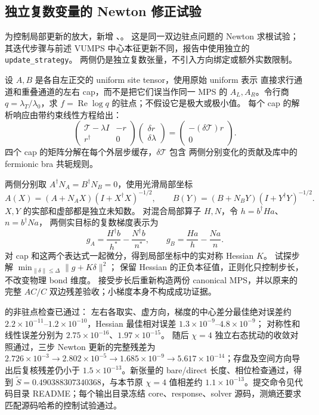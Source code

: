 \subsection{独立复数变量的 Newton 修正试验}
为控制局部更新的放大，新增 、。
这是同一双边驻点问题的 Newton 求根试验；其迭代步骤与前述 VUMPS
中心本征更新不同，报告中使用独立的 \texttt{update\_strategy}。
两侧仍是独立复数张量，不引入方向绑定或额外实数限制。

设 $A,B$ 是各自左正交的 uniform site tensor，使用原始 uniform 表示
直接求行通道和重叠通道的左右 cap，而不是把它们误当作同一 MPS 的
$A_L,A_R$。令行商 $q=\lambda_T/\lambda_0$，求
$f=\operatorname{Re}\log q$ 的驻点；不假设它是极大或极小值。
每个 cap 的解析响应由带约束线性方程给出：
\[
 \begin{pmatrix}\mathcal T-\lambda I&-r\\r^\dagger&0\end{pmatrix}
 \begin{pmatrix}\delta r\\\delta\lambda\end{pmatrix}
 =\begin{pmatrix}-(\delta\mathcal T)r\\0\end{pmatrix}.
\]
四个 cap 的矩阵分解在每个外层步缓存，$\delta\mathcal T$ 包含
两侧分别变化的贡献及库中的 fermionic bra 共轭规则。

两侧分别取 $A^\dagger N_A=B^\dagger N_B=0$，使用光滑局部坐标
\[
 A(X)=(A+N_AX)(I+X^\dagger X)^{-1/2},\qquad
 B(Y)=(B+N_BY)(I+Y^\dagger Y)^{-1/2}.
\]
$X,Y$ 的实部和虚部都是独立未知数。
对混合局部算子 $H,N$，令 $h=b^\dagger Ha$、$n=b^\dagger Na$，
两侧实目标的复数梯度表示为
\[
 g_A=\frac{H^\dagger b}{h^*}-\frac{N^\dagger b}{n^*},\qquad
 g_B=\frac{Ha}{h}-\frac{Na}{n}.
\]
对 cap 和这两个表达式一起微分，得到局部坐标中的实对称 Hessian $K$。
试探步解 $\min_{\|\delta\|\leq\Delta}\|g+K\delta\|^2$；
保留 Hessian 的正负本征值，正则化只控制步长，不改变物理 bond 维度。
接受步长后重新构造两份 canonical MPS，并以原来的完整 $AC/C$
双边残差验收；小梯度本身不构成成功证据。

 的非驻点检查已通过：
左右各取实、虚方向，梯度的中心差分最佳绝对误差约
$2.2\times10^{-11}$--$1.2\times10^{-10}$，Hessian 最佳相对误差
$1.3\times10^{-9}$--$4.8\times10^{-9}$；
对称性和线性误差分别为 $2.75\times10^{-16}$、$1.97\times10^{-15}$。
随后 $\chi=4$ 独立右态扰动的收敛对照通过，三步 Newton 更新的完整残差为
$2.726\times10^{-3}\to2.802\times10^{-5}\to1.685\times10^{-9}
\to5.617\times10^{-14}$；存盘及空间方向导出后复核残差仍小于
$1.5\times10^{-13}$。新张量的 bare/direct 长度、相位检查通过，得到
$\widetilde S=0.490388307340368$，与本节原 $\chi=4$ 值相差约
$1.1\times10^{-13}$。提交命令见代码目录 README；每个输出目录冻结
core、response、solver 源码，测熵还要求匹配源码哈希的控制试验通过。

